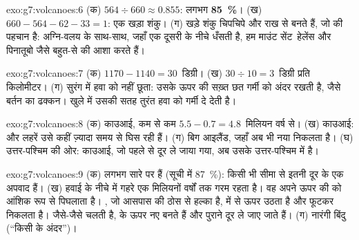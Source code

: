 \begin{solution}{exo:g7:volcanoes:6}
(क) $564 \div 660 \approx 0.855$: लगभग \textbf{85~\%}। (ख)
$660 - 564 - 62 - 33 = 1$: एक खड़ा शंकु। (ग) खड़े शंकु चिपचिपे  और राख से
बनते हैं, जो  की पहचान है: अग्नि-वलय के साथ-साथ, जहाँ एक 
दूसरी के नीचे धँसती है, हम माउंट सेंट~हेलेंस और पिनातूबो जैसे बहुत-से  की आशा करते हैं।
\end{solution}

\begin{solution}{exo:g7:volcanoes:7}
(क) $1170 - 1140 = 30$~डिग्री। (ख) $30 \div 10 = 3$~डिग्री प्रति
किलोमीटर। (ग) सुरंग में  हवा को नहीं छूता: उसके ऊपर की सख़्त छत गर्मी को
अंदर रखती है, जैसे बर्तन का ढक्कन। खुले में उसकी सतह तुरंत हवा को गर्मी दे देती
है।
\end{solution}

\begin{solution}{exo:g7:volcanoes:8}
(क) काउआई, कम से कम $5.5 - 0.7 = 4.8$~मिलियन वर्ष से। (ख) काउआई:  और
लहरें उसे कहीं ज़्यादा समय से घिस रही हैं। (ग) बिग आइलैंड, जहाँ अब भी नया 
निकलता है। (घ) उत्तर-पश्चिम की ओर: काउआई, जो पहले  से दूर ले जाया गया,
अब उसके उत्तर-पश्चिम में है।
\end{solution}

\begin{solution}{exo:g7:volcanoes:9}
(क) लगभग सारे   पर हैं (सूची में 87~\%): किसी भी सीमा से
इतनी दूर के  एक अपवाद हैं। (ख) हवाई के नीचे  में गहरे एक  मिलियनों वर्षों तक गरम रहता है। वह अपने ऊपर की  को आंशिक रूप से
पिघलाता है। , जो आसपास की ठोस  से हल्का है,  में से ऊपर उठता है
और फूटकर निकलता है। जैसे-जैसे  चलती है,  के ऊपर नए  बनते
हैं और पुराने दूर ले जाए जाते हैं। (ग) नारंगी बिंदु (``किसी  के
अंदर'')।
\end{solution}

